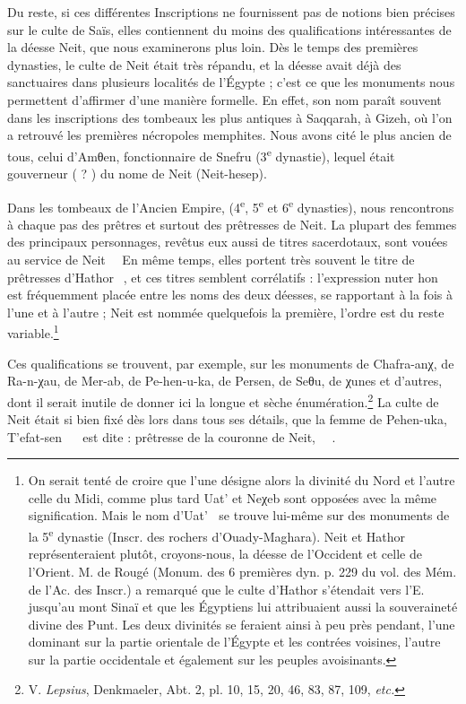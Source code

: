 \documentclass[a4paper, 11pt, oneside]{article}
\newcommand*\hieroAAAG{}
\newcommand*\hieroAAAO{}
\newcommand*\hieroAAAQ{}
\newcommand*\hieroAAAY{}
\newcommand*\hieroAABF{}
\newcommand*\hieroAACB{\raisebox{0.5ex}{}}
\newcommand*\hieroAACN{\raisebox{1ex}{}}
\newcommand*\hieroAACS{}
\newcommand*\hieroAAEK{}
\newcommand*\hieroAAHC{}
\newcommand*\hieroAAQY{}
\newcommand*\hieroAARM{}
\newcommand*\hieroAARN{}
\newcommand*\hieroAARP{}
\newcommand*\hieroAARQ{\raisebox{0.5ex}{}}
\begin{document}
Du reste, si ces différentes Inscriptions ne fournissent pas de notions bien précises sur le culte de Saïs, elles contiennent du moins des qualifications intéressantes de la déesse Neit, que nous examinerons plus loin.
 Dès le temps des premières dynasties, le culte de Neit était très répandu, et la déesse avait déjà des sanctuaires dans plusieurs localités de l'Égypte ; c'est ce que les monuments nous permettent d'affirmer d'une manière formelle. En effet, son nom paraît souvent dans les inscriptions des tombeaux les plus antiques à Saqqarah, à Gizeh, où l'on a retrouvé les premières nécropoles memphites. Nous avons cité le plus ancien de tous, celui d'Amθen, fonctionnaire de Snefru (3\textsuperscript{e} dynastie), lequel était gouverneur ( ? ) du nome de Neit (Neit-hesep).

Dans les tombeaux de l'Ancien Empire, (4\textsuperscript{e}, 5\textsuperscript{e} et 6\textsuperscript{e} dynasties), nous rencontrons à chaque pas des prêtres et surtout des prêtresses de Neit. La plupart des femmes des principaux personnages, revêtus eux aussi de titres sacerdotaux, sont vouées au service de Neit $\hieroAAAQ\:\hieroAABF\allowbreak\:\hieroAAEK\:\hieroAAHC$ En même temps, elles portent très souvent le titre de prêtresses d'Hathor $\hieroAARM\:\hieroAAEK\:\hieroAAHC$, et ces titres semblent corrélatifs : l'expression nuter hon $\hieroAAEK\:\hieroAAHC$ est fréquemment placée entre les noms des deux déesses, se rapportant à la fois à l'une et à l'autre ; Neit est nommée quelquefois la première, l'ordre est du reste variable.\footnote{On serait tenté de croire que l'une désigne alors la divinité du Nord et l'autre celle du Midi, comme plus tard Uat' et Neχeb sont opposées avec la même signification. Mais le nom d'Uat' $\hieroAAAY\:\hieroAARN$ se trouve lui-même sur des monuments de la 5\textsuperscript{e} dynastie (Inscr. des rochers d'Ouady-Maghara). Neit et Hathor représenteraient plutôt, croyons-nous, la déesse de l'Occident et celle de l'Orient. M. de Rougé (Monum. des 6 premières dyn. p. 229 du vol. des Mém. de l'Ac. des Inscr.) a remarqué que le culte d'Hathor s'étendait vers l'E. jusqu'au mont Sinaï et que les Égyptiens lui attribuaient aussi la souveraineté divine des Punt. Les deux divinités se feraient ainsi à peu près pendant, l'une dominant sur la partie orientale de l'Égypte et les contrées voisines, l'autre sur la partie occidentale et également sur les peuples avoisinants.}

Ces qualifications se trouvent, par exemple, sur les monuments de Chafra-anχ, de Ra-n-χau, de Mer-ab, de Pe-hen-u-ka, de Persen, de Seθu, de χunes et d'autres, dont il serait inutile de donner ici la longue et sèche énumération.\footnote{V. \emph{Lepsius}, Denkmaeler, Abt. 2, pl. 10, 15, 20, 46, 83, 87, 109, \emph{etc.}} La culte de Neit était si bien fixé dès lors dans tous ses détails, que la femme de Pehen-uka, T'efat-sen $\hieroAAQY\:\hieroAAAG\:\hieroAACB\allowbreak\:\hieroAACS\:\hieroAACN$ est dite : prêtresse de la couronne de Neit, $\hieroAAAO\:\hieroAARP\:\hieroAARQ\allowbreak\:\hieroAAEK\:\hieroAAHC$.
\end{document}
